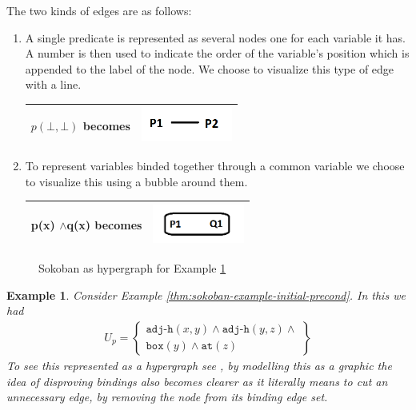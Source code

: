 \documentclass[../Master.tex]{subfiles}
\begin{document}
	The two kinds of edges are as follows: 
	\begin{enumerate}
		\item A single predicate is represented as several nodes one for each variable
		it has. A number is then used to indicate the order of the variable's
		position which is appended to the label of the node. We choose to
		visualize this type of edge with a line.\\
		\begin{tabular}{|c|c|}
			\hline 
			$p(\bot,\bot)$ becomes & \includegraphics[width=3cm]{../Graphics/connected_nodes}
			\tabularnewline
			\hline 
		\end{tabular}
		\item To represent variables binded together through a common variable we
		choose to visualize this using a bubble around them.\\
		\begin{tabular}{|c|c|}
			\hline 
			p(x) $\land$q(x) becomes & \includegraphics[width=3cm]{../Graphics/connected_binding}\tabularnewline
			\hline 
		\end{tabular}
	\end{enumerate}
	\begin{figure}
		
		\caption{\label{fig:Sokoban-as-hypergraph}Sokoban as hypergraph for Example \ref{thm:sokoban-hypergraph}}
		
	\end{figure}
	
\newtheorem{thm-sokoban-hypergraph}{Example}[section]
\begin{thm-sokoban-hypergraph}\label{thm:sokoban-hypergraph}
	Consider Example \ref{thm:sokoban-example-initial-precond}. In this we had 
	\begin{align*}
		U_p =
		\left\{
			\begin{gathered} 
				\texttt{adj-h}(x, y) \land \texttt{adj-h}(y, z) \land 
				\\ \texttt{box}(y) \land \texttt{at}(z) 
			\end{gathered}
		\right\}
	\end{align*}
	To see this represented as a hypergraph see ,
	by modelling this as a graphic the idea of disproving bindings also
	becomes clearer as it literally means to cut an unnecessary edge,
	by removing the node from its binding edge set.
\end{thm-sokoban-hypergraph}
	
\end{document}

